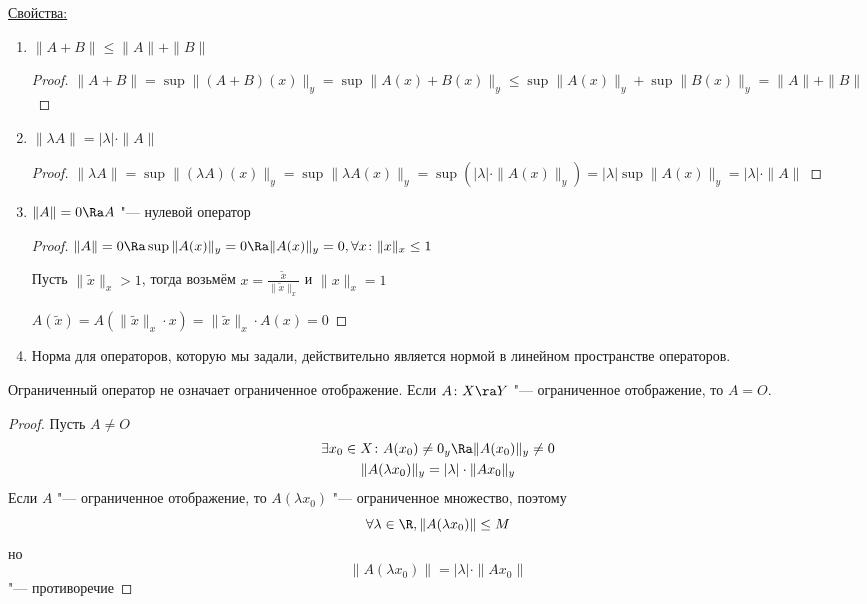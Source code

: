 \underline{Свойства:}
\begin{enumerate}
\item
	$\|A + B\| \le \|A\| + \|B\|$
	\begin{proof}
		$\|A + B\| = \sup \|(A + B)(x)\|_y = \sup \|A(x) + B(x)\|_y \le \sup \|A(x)\|_y + \sup \|B(x)\|_y = \|A\| + \|B\|$
	\end{proof}

\item
	$\|\lambda A\| = |\lambda| \cdot \|A\|$
	\begin{proof}
		$\|\lambda A\| = \sup \| (\lambda A)(x) \|_y = \sup \| \lambda A(x) \|_y = \sup( |\lambda| \cdot \|A(x) \|_y) = |\lambda| \sup \|A(x)\|_y = |\lambda| \cdot \|A\|$
	\end{proof}

\item
	$\|A\| = 0 \Ra A$ "--- нулевой оператор
	\begin{proof}
		$\|A\| = 0 \Ra \sup \|A(x)\|_y = 0 \Ra \|A(x)\|_y = 0, \forall x \colon \|x\|_x \le 1$

		Пусть $\|\tilde x\|_x > 1$, тогда возьмём $x = \frac{\tilde x}{\|\tilde x\|_x}$ и $\|x\|_x = 1$

		$A(\tilde x) = A(\|\tilde x\|_x \cdot x) = \|\tilde x\|_x \cdot A(x) = 0$
	\end{proof}

\item
	Норма для операторов, которую мы задали, действительно является нормой в линейном пространстве операторов.
\end{enumerate}

\begin{Rem}
	Ограниченный оператор не означает ограниченное отображение. Если $A \colon X \ra Y$ "--- ограниченное отображение, то $A = O$.
\end{Rem}
\begin{proof}
	Пусть $A \ne O$
	\begin{gather*}
		\exists x_0 \in X \colon A(x_0) \ne 0_y \Ra \|A(x_0)\|_y \ne 0 \\
		\|A(\lambda x_0)\|_y = |\lambda| \cdot \|Ax_0\|_y
	\end{gather*}
	Если $A$ "--- ограниченное отображение, то $A(\lambda x_0)$ "--- ограниченное множество, поэтому
	\[ \forall \lambda \in \R, \|A(\lambda x_0)\| \le M \]
	но
	\[ \|A(\lambda x_0)\| = |\lambda| \cdot \|Ax_0\| \]
	"--- противоречие
\end{proof}

